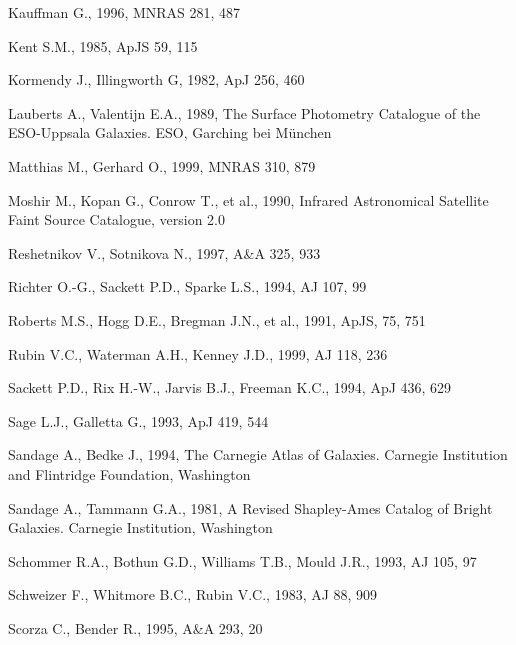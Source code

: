 \documentclass[twocolumns]{aa}
\begin{document}
\begin{thebibliography}{}
 Kauffman G., 1996, MNRAS 281, 487

 Kent S.M., 1985, ApJS 59, 115

 Kormendy J., 
  Illingworth G, 1982, ApJ 256, 460

 Lauberts A., Valentijn E.A.,
  1989, The Surface Photometry Catalogue of the ESO-Uppsala Galaxies.
  ESO, Garching bei M\"unchen

 Matthias M., Gerhard O., 
  1999, MNRAS 310, 879 

 Moshir M., Kopan G., Conrow T.,
  et al., 1990, Infrared Astronomical Satellite 
  Faint Source Catalogue, version 2.0 

 Reshetnikov V., Sotnikova N.,
  1997, A\&A 325, 933

 Richter O.-G., Sackett 
  P.D., Sparke L.S., 1994, AJ 107, 99

 Roberts M.S., Hogg D.E., 
  Bregman J.N., et al., 
  1991, ApJS, 75, 751
 
 Rubin V.C., 
  Waterman A.H., Kenney J.D., 1999, AJ 118, 236

 Sackett P.D., Rix H.-W., Jarvis B.J., 
  Freeman K.C., 1994, ApJ 436, 629

 Sage L.J., Galletta G., 1993, ApJ 
  419, 544

 Sandage A., Bedke J., 1994, The
  Carnegie Atlas of Galaxies. Carnegie Institution and Flintridge 
  Foundation, Washington 

 Sandage A., Tammann G.A., 1981, A
  Revised Shapley-Ames Catalog of Bright Galaxies. Carnegie Institution, 
  Washington

 Schommer R.A., Bothun G.D.,
  Williams T.B., Mould J.R., 1993, AJ 105, 97

 Schweizer 
  F., Whitmore B.C., Rubin V.C., 1983, AJ 88, 909 

 Scorza C., Bender R., 1995, 
  A\&A 293, 20 


\end{thebibliography}
\end{document}
